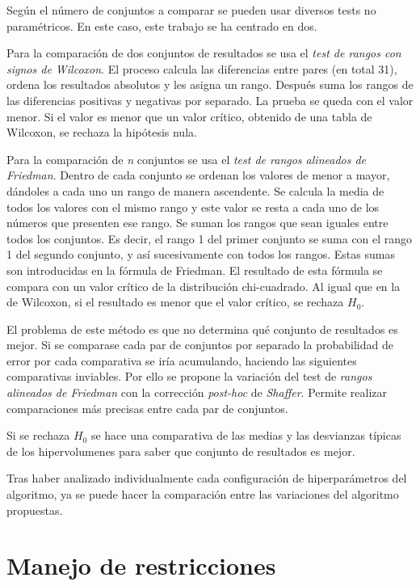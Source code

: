 Según el número de conjuntos a comparar se pueden usar diversos tests no paramétricos. En este caso, este trabajo se ha centrado en dos.

Para la comparación de dos conjuntos de resultados se usa el \textit{test de rangos con signos de Wilcoxon}. El proceso calcula las diferencias entre pares (en total 31), ordena los resultados absolutos y les asigna un rango. Después suma los rangos de las diferencias positivas y negativas por separado. La prueba se queda con el valor menor. Si el valor es menor que un valor crítico, obtenido de una tabla de Wilcoxon, se rechaza la hipótesis nula.~\cite{scipy2024wilcoxon}

Para la comparación de \textit{n} conjuntos se usa el \textit{test de rangos alineados de Friedman}. Dentro de cada conjunto se ordenan los valores de menor a mayor, dándoles a cada uno un rango de manera ascendente. Se calcula la media de todos los valores con el mismo rango y este valor se resta a cada uno de los números que presenten ese rango. Se suman los rangos que sean iguales entre todos los conjuntos. Es decir, el rango 1 del primer conjunto se suma con el rango 1 del segundo conjunto, y así sucesivamente con todos los rangos. Estas sumas son introducidas en la fórmula de Friedman. El resultado de esta fórmula se compara con un valor crítico de la distribución chi-cuadrado. Al igual que en la de Wilcoxon, si el resultado es menor que el valor crítico, se rechaza \(H_0\).~\cite{stac2024friedman}

El problema de este método es que no determina qué conjunto de resultados es mejor. Si se comparase cada par de conjuntos por separado la probabilidad de error por cada comparativa se iría acumulando, haciendo las siguientes comparativas inviables. Por ello se propone la variación del test de \textit{rangos alineados de Friedman} con la corrección \textit{post-hoc} de \textit{Shaffer}. Permite realizar comparaciones más precisas entre cada par de conjuntos.~\cite{stac2024shaffer}

Si se rechaza \(H_0\) se hace una comparativa de las medias y las desvianzas típicas de los hipervolumenes para saber que conjunto de resultados es mejor.

Tras haber analizado individualmente cada configuración de hiperparámetros del algoritmo, ya se puede hacer la comparación entre las variaciones del algoritmo propuestas.

\section{Manejo de restricciones}
\label{ch:manejo-restricciones-experimentacion}

